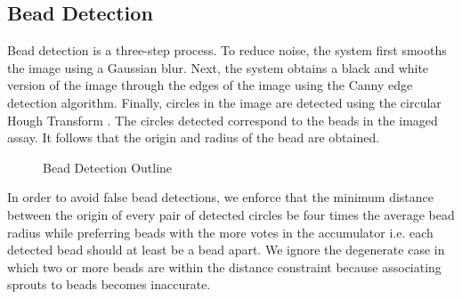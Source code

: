 \documentclass{sig-alternate}
\begin{document}
	\subsection{Bead Detection} %
	\label{sub:Bead Extraction}
		Bead detection is a three-step process. To reduce noise, the
		system first smooths the image using a Gaussian blur. Next, the
		system obtains a black and white version of the image through the
		edges of the image using the Canny edge detection algorithm.
		Finally, circles in the image are detected using the circular
		Hough Transform \cite{yuen89}. The circles detected correspond to
		the beads in the imaged assay. It follows that the origin and
		radius of the bead are obtained.
		\begin{figure}[htp!]
			\centering
			\caption{Bead Detection Outline}
			\label{fig:beadex}
		\end{figure}

		In order to avoid false bead detections, we enforce that the
		minimum distance between the origin of every pair of detected
		circles be four times the average bead radius while preferring
		beads with the more votes in the accumulator i.e.  each detected
		bead should at least be a bead apart. We ignore the degenerate
		case in which two or more beads are within the distance constraint
		because associating sprouts to beads becomes inaccurate.
\end{document}
